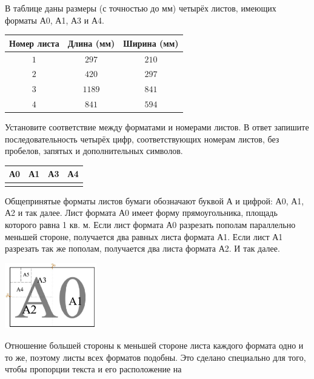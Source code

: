 \begin{class}[number=4]
	\begin{listofex}
		\item В таблице даны размеры (с точностью до мм) четырёх листов, имеющих форматы А0, А1, А3 и А4.
		\begin{center}
			\footnotesize
			\begin{tabular}{|c|c|c|}
				\hline
				\rowcolor{gray}\textbf{Номер листа}&\textbf{Длина (мм)}&\textbf{Ширина (мм)}\\
				\hline
				\( 1 \)&\( 297 \)&\( 210 \)\\
				\hline
				\( 2 \)&\( 420 \)&\( 297 \)\\
				\hline
				\( 3 \)&\( 1189 \)&\( 841 \)\\
				\hline
				\( 4 \)&\( 841 \)&\( 594 \)\\
				\hline
			\end{tabular}
		\end{center}
		Установите соответствие между форматами и номерами листов. В ответ запишите последовательность четырёх цифр, соответствующих номерам листов, без пробелов, запятых и дополнительных символов.
			\begin{center}
			\footnotesize
			\begin{tabular}{|c|c|c|c|}
				\hline
				\rowcolor{gray}А0&А1&А3&А4\\
				\hline
				&&&\\
				\hline
			\end{tabular}
		\end{center}
		Общепринятые форматы листов бумаги обозначают буквой А и цифрой: А0, А1, А2 и так далее. Лист формата А0 имеет форму прямоугольника, площадь которого равна 1 кв. м. Если лист формата А0 разрезать пополам параллельно меньшей стороне, получается два равных листа формата А1. Если лист А1 разрезать так же пополам, получается два листа формата А2. И так далее.
		\begin{center}
			\includegraphics[align=t, width=0.3\textwidth]{pics/G91M3C4-1}
		\end{center}
		Отношение большей стороны к меньшей стороне листа каждого формата одно и то же, поэтому листы всех форматов подобны. Это сделано специально для того, чтобы пропорции текста и его расположение на

\end{listofex}
\end{class}
